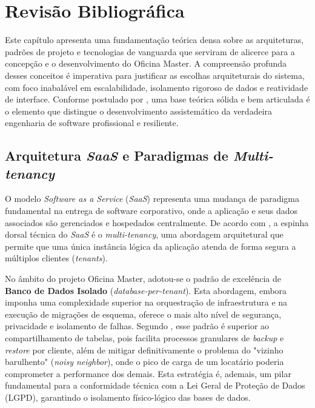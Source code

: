 
\chapter{Revisão Bibliográfica}
\label{cap:revisao-bibliografica}

Este capítulo apresenta uma fundamentação teórica densa sobre as arquiteturas, padrões de projeto e tecnologias de vanguarda que serviram de alicerce para a concepção e o desenvolvimento do Oficina Master. A compreensão profunda desses conceitos é imperativa para justificar as escolhas arquiteturais do sistema, com foco inabalável em escalabilidade, isolamento rigoroso de dados e reatividade de interface. Conforme postulado por , uma base teórica sólida e bem articulada é o elemento que distingue o desenvolvimento assistemático da verdadeira engenharia de software profissional e resiliente.

\section{Arquitetura \textit{SaaS} e Paradigmas de \textit{Multi-tenancy}}

O modelo \textit{Software as a Service} (\textit{SaaS}) representa uma mudança de paradigma fundamental na entrega de software corporativo, onde a aplicação e seus dados associados são gerenciados e hospedados centralmente. De acordo com , a espinha dorsal técnica do \textit{SaaS} é o \textit{multi-tenancy}, uma abordagem arquitetural que permite que uma única instância lógica da aplicação atenda de forma segura a múltiplos clientes (\textit{tenants}).

No âmbito do projeto Oficina Master, adotou-se o padrão de excelência de \textbf{Banco de Dados Isolado} (\textit{database-per-tenant}). Esta abordagem, embora imponha uma complexidade superior na orquestração de infraestrutura e na execução de migrações de esquema, oferece o mais alto nível de segurança, privacidade e isolamento de falhas. Segundo , esse padrão é superior ao compartilhamento de tabelas, pois facilita processos granulares de \textit{backup} e \textit{restore} por cliente, além de mitigar definitivamente o problema do "vizinho barulhento" (\textit{noisy neighbor}), onde o pico de carga de um locatário poderia comprometer a performance dos demais. Esta estratégia é, ademais, um pilar fundamental para a conformidade técnica com a Lei Geral de Proteção de Dados (LGPD), garantindo o isolamento físico-lógico das bases de dados.

